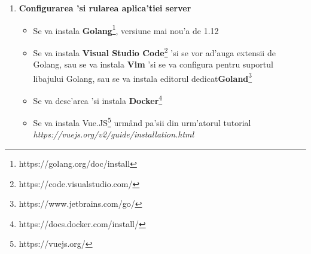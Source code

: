 \documentclass[12pt,a4paper,twoside]{report}
\begin{document}
\begin{enumerate}[label=Pasul \arabic*]
{}
\item{\textbf{Configurarea 'si rularea aplica'tiei server}
\begin{itemize}
\item{Se va instala \textbf{Golang}\footnote{https://golang.org/doc/install}, versiune mai nou'a de 1.12}
\item{Se va instala  \textbf{Visual Studio Code}\footnote{https://code.visualstudio.com/} 'si se vor ad'auga extensii de Golang, sau se va instala  \textbf{Vim} 'si se va configura pentru suportul libajului Golang, sau se va instala  editorul dedicat\textbf{Goland}\footnote{https://www.jetbrains.com/go/}}
\item{Se va desc'arca 'si  instala  \textbf{Docker}\footnote{https://docs.docker.com/install/}}
\item{Se va instala Vue.JS\footnote{https://vuejs.org/}  urmând pa'sii din urm'atorul tutorial \\ \textit{https://vuejs.org/v2/guide/installation.html}}


\end{itemize}}
\end{enumerate}
\end{document}
